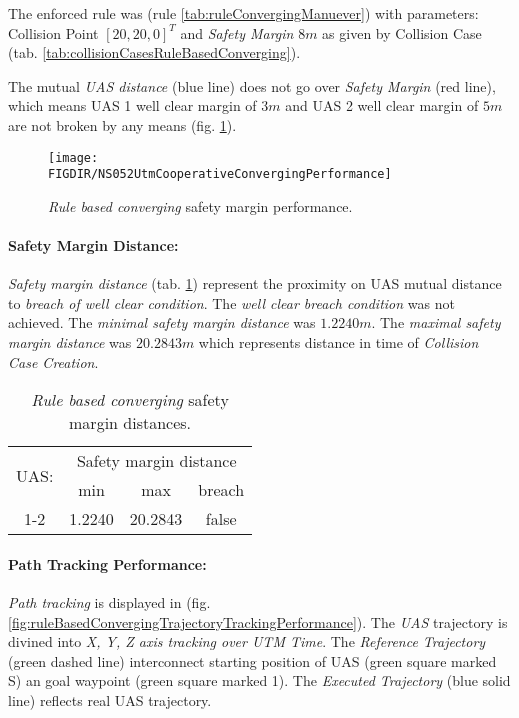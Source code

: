 The enforced rule was (rule \ref{tab:ruleConvergingManuever}) with parameters: Collision Point $[20,20,0]^T$ and \emph{Safety Margin} $8m$ as given by Collision Case (tab. \ref{tab:collisionCasesRuleBasedConverging}).

The mutual \emph{UAS distance} (blue line) does not go over \emph{Safety Margin} (red line), which means UAS 1 well clear margin of $3m$ and UAS 2 well clear margin of $5m$ are not broken by any means (fig. \ref{fig:testCaseRuleBasedConvergingAvoidancePerformance}).

\begin{figure}[H]
    \centering
    \texttt{[image: \\FIGDIR/NS052UtmCooperativeConvergingPerformance]} 
    \caption{\emph{Rule based converging} safety margin performance.}
    \label{fig:testCaseRuleBasedConvergingAvoidancePerformance}
\end{figure}


\paragraph{Safety Margin Distance:} \emph{Safety margin distance} (tab. \ref{tab:testCaseRuleBasedConvergingSafetyMarginDistances}) represent the proximity on UAS mutual distance to \emph{breach of well clear condition}. The \emph{well clear breach condition} was not achieved. The \emph{minimal safety margin distance} was $1.2240 m$. The \emph{maximal safety margin distance} was $20.2843m$ which represents distance in time of \emph{Collision Case Creation}.

\begin{table}[H]
    \centering
    \begin{tabular}{c||c|c|c}
        \multirow{2}{*}{UAS:} & \multicolumn{3}{c}{Safety margin distance} \\ \cline{2-4} 
                  & min          & max         & breach         \\ \hline\hline
            1-2   & 1.2240       & 20.2843     & false          \\ 
    \end{tabular}
    \caption{\emph{Rule based converging} safety margin distances.}
    \label{tab:testCaseRuleBasedConvergingSafetyMarginDistances}
\end{table}

\paragraph{Path Tracking Performance:} \emph{Path tracking} is displayed in (fig. \ref{fig:ruleBasedConvergingTrajectoryTrackingPerformance}). The \emph{UAS} trajectory is divined into \emph{X, Y, Z axis tracking over UTM Time}. The \emph{Reference Trajectory} (green dashed line) interconnect starting position of UAS (green square marked S) an goal waypoint (green square marked 1). The \emph{Executed Trajectory} (blue solid line) reflects real UAS trajectory. 

